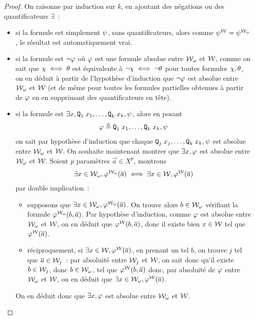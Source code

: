 \begin{proof}
  On raisonne par induction sur $k$, en ajoutant des négations ou des
  quantificateurs $\exists$~:
  \begin{itemize}
  \item si la formule est simplement $\psi$, sans quantificateurs, alors comme
    $\psi^{\mathcal{W}} = \psi^{\mathcal{W}_\omega}$, le résultat est automatiquement vrai.
  \item si la formule est $\lnot \varphi$ où $\varphi$ est une formule absolue
    entre $\mathcal{W}_\omega$ et $\mathcal{W}$, comme on sait que $\chi \iff \theta$ est
    équivalente à $\lnot\chi \iff \lnot \theta$ pour toutes formules
    $\chi,\theta$, on en déduit à partir de l'hypothèse d'induction que
    $\lnot \varphi$ est absolue entre $\mathcal{W}_\omega$ et $\mathcal{W}$ (et de même pour
    toutes les formules partielles obtenues à partir de $\varphi$ en en
    supprimant des quantificateurs en tête).
  \item si la formule est
    $\exists x, {\normalfont\texttt{Q}}_1\;x_1,\ldots,{\normalfont\texttt{Q}}_k\;x_k,\psi$, alors en posant
    \[\varphi \triangleq {\normalfont\texttt{Q}}_1\;x_1,\ldots,{\normalfont\texttt{Q}}_k\;x_k, \psi\]
    on sait par hypothèse d'induction que chaque
    ${\normalfont\texttt{Q}}_j\;x_j,\ldots,{\normalfont\texttt{Q}}_k\;x_k,\psi$ est absolue entre
    $\mathcal{W}_\omega$ et $\mathcal{W}$.
    On souhaite maintenant montrer que $\exists x, \varphi$ est absolue
    entre $\mathcal{W}_\omega$ et $\mathcal{W}$. Soient $p$ paramètres $\vec a \in X^p$,
    montrons
    \[\exists x\in \mathcal{W}_\omega, \varphi^{\mathcal{W}_\omega}(\overline{a})
    \iff \exists x \in \mathcal{W}, \varphi^{\mathcal{W}}(\overline{a})\]
    par double implication~:
    \begin{itemize}
    \item supposons que $\exists x \in \mathcal{W}_\omega,\varphi^{\mathcal{W}_\omega}(\overline{a})$.
      On trouve alors $b \in \mathcal{W}_\omega$ vérifiant la formule
      $\varphi^{\mathcal{W}_\omega}(b,\overline{a})$. Par hypothèse d'induction, comme $\varphi$
      est absolue entre $\mathcal{W}_\omega$ et $\mathcal{W}$, on en déduit que
      $\varphi^{\mathcal{W}}(b,\overline{a})$, donc il existe bien
      $x \in \mathcal{W}$ tel que $\varphi^{\mathcal{W}}(\overline{a})$.
    \item réciproquement, si
      $\exists x\in\mathcal{W}, \varphi^{\mathcal{W}}(\overline{a})$, en prenant un tel $b$, on
      trouve $j$ tel que $\overline{a} \in \mathcal{W}_j$~: par absoluité entre $\mathcal{W}_j$
      et $\mathcal{W}$, on sait donc qu'il existe $b \in \mathcal{W}_j$, donc
      $b \in \mathcal{W}_\omega$, tel que $\varphi^{\mathcal{W}}(b,\overline{a})$ donc, par absoluité
      de $\varphi$ entre $\mathcal{W}_\omega$ et $\mathcal{W}$, on en déduit
      que $\exists x \in \mathcal{W}_\omega, \varphi^{\mathcal{W}}(\overline{a})$.
    \end{itemize}
    On en déduit donc que $\exists x, \varphi$ est absolue entre $\mathcal{W}_\omega$
    et $\mathcal{W}$.\qedhere
  \end{itemize}
\end{proof}

